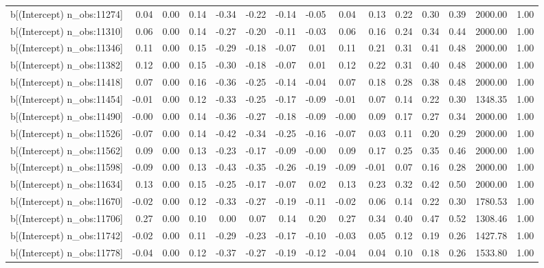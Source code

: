 \begin{table}[ht]
\begin{tabular}{rrrrrrrrrrrrrrr}
  b[(Intercept) n\_obs:11274] & 0.04 & 0.00 & 0.14 & -0.34 & -0.22 & -0.14 & -0.05 & 0.04 & 0.13 & 0.22 & 0.30 & 0.39 & 2000.00 & 1.00 \\ 
  b[(Intercept) n\_obs:11310] & 0.06 & 0.00 & 0.14 & -0.27 & -0.20 & -0.11 & -0.03 & 0.06 & 0.16 & 0.24 & 0.34 & 0.44 & 2000.00 & 1.00 \\ 
  b[(Intercept) n\_obs:11346] & 0.11 & 0.00 & 0.15 & -0.29 & -0.18 & -0.07 & 0.01 & 0.11 & 0.21 & 0.31 & 0.41 & 0.48 & 2000.00 & 1.00 \\ 
  b[(Intercept) n\_obs:11382] & 0.12 & 0.00 & 0.15 & -0.30 & -0.18 & -0.07 & 0.01 & 0.12 & 0.22 & 0.31 & 0.40 & 0.48 & 2000.00 & 1.00 \\ 
  b[(Intercept) n\_obs:11418] & 0.07 & 0.00 & 0.16 & -0.36 & -0.25 & -0.14 & -0.04 & 0.07 & 0.18 & 0.28 & 0.38 & 0.48 & 2000.00 & 1.00 \\ 
  b[(Intercept) n\_obs:11454] & -0.01 & 0.00 & 0.12 & -0.33 & -0.25 & -0.17 & -0.09 & -0.01 & 0.07 & 0.14 & 0.22 & 0.30 & 1348.35 & 1.00 \\ 
  b[(Intercept) n\_obs:11490] & -0.00 & 0.00 & 0.14 & -0.36 & -0.27 & -0.18 & -0.09 & -0.00 & 0.09 & 0.17 & 0.27 & 0.34 & 2000.00 & 1.00 \\ 
  b[(Intercept) n\_obs:11526] & -0.07 & 0.00 & 0.14 & -0.42 & -0.34 & -0.25 & -0.16 & -0.07 & 0.03 & 0.11 & 0.20 & 0.29 & 2000.00 & 1.00 \\ 
  b[(Intercept) n\_obs:11562] & 0.09 & 0.00 & 0.13 & -0.23 & -0.17 & -0.09 & -0.00 & 0.09 & 0.17 & 0.25 & 0.35 & 0.46 & 2000.00 & 1.00 \\ 
  b[(Intercept) n\_obs:11598] & -0.09 & 0.00 & 0.13 & -0.43 & -0.35 & -0.26 & -0.19 & -0.09 & -0.01 & 0.07 & 0.16 & 0.28 & 2000.00 & 1.00 \\ 
  b[(Intercept) n\_obs:11634] & 0.13 & 0.00 & 0.15 & -0.25 & -0.17 & -0.07 & 0.02 & 0.13 & 0.23 & 0.32 & 0.42 & 0.50 & 2000.00 & 1.00 \\ 
  b[(Intercept) n\_obs:11670] & -0.02 & 0.00 & 0.12 & -0.33 & -0.27 & -0.19 & -0.11 & -0.02 & 0.06 & 0.14 & 0.22 & 0.30 & 1780.53 & 1.00 \\ 
  b[(Intercept) n\_obs:11706] & 0.27 & 0.00 & 0.10 & 0.00 & 0.07 & 0.14 & 0.20 & 0.27 & 0.34 & 0.40 & 0.47 & 0.52 & 1308.46 & 1.00 \\ 
  b[(Intercept) n\_obs:11742] & -0.02 & 0.00 & 0.11 & -0.29 & -0.23 & -0.17 & -0.10 & -0.03 & 0.05 & 0.12 & 0.19 & 0.26 & 1427.78 & 1.00 \\ 
  b[(Intercept) n\_obs:11778] & -0.04 & 0.00 & 0.12 & -0.37 & -0.27 & -0.19 & -0.12 & -0.04 & 0.04 & 0.10 & 0.18 & 0.26 & 1533.80 & 1.00 \\ 

\end{tabular}
\end{table}
